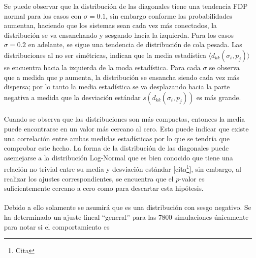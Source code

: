 \documentclass[a4paper,11pt]{book}
\theoremstyle{plain}
\theoremstyle{definition}
\begin{document}
Se puede observar que la distribución de las diagonales tiene una tendencia FDP normal para los casos con $\sigma=0.1$, sin embargo conforme las probabilidades aumentan, haciendo que los sistemas sean cada vez más conectados, la distribución se va ensanchando y sesgando hacia la izquierda. Para los casos $\sigma=0.2$ en adelante, se sigue una tendencia de distribución de cola pesada. Las distribuciones al no ser simétricas, indican que la media estadística $\langle d_{kk}(\sigma_i,p_j)\rangle$ se encuentra hacia la izquierda de la moda estadística. Para cada $\sigma$ se observa que a medida que $p$ aumenta, la distribución se ensancha siendo cada vez más dispersa; por lo tanto la media estadística se va desplazando hacia la parte negativa a medida que la desviación estándar $s(d_{kk}(\sigma_i,p_j))$ es más grande.
\\
\\
Cuando se observa que las distribuciones son más compactas, entonces la media puede encontrarse en un valor más cercano al cero. Esto puede indicar que existe una correlación entre ambas medidas estadísticas por lo que se tendría que comprobar este hecho. La forma de la distribución de las diagonales puede asemejarse a la distribución Log-Normal que es bien conocido que tiene una relación no trivial entre su media y desviación estándar [cita\footnote{Cita}], sin embargo, al realizar los ajustes correspondientes, se encuentra que el $p$-valor es suficientemente cercano a cero como para descartar esta hipótesis. \\
\\
Debido a ello solamente se asumirá que es una distribución con sesgo negativo. Se ha determinado un ajuste lineal ``general'' para las 7800 simulaciones únicamente para notar si el comportamiento es 
\end{document}
